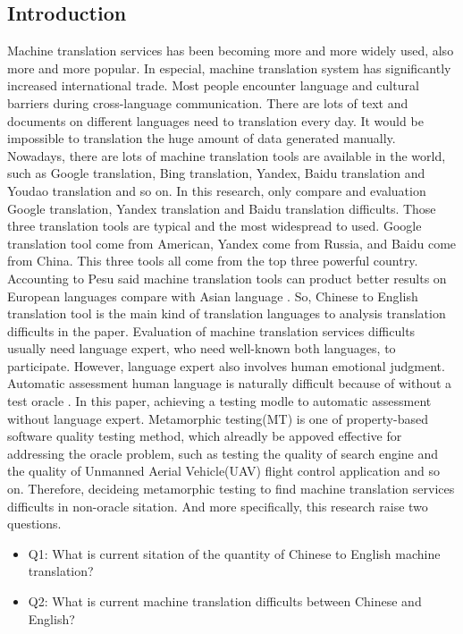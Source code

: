 \documentclass[conference]{IEEEtran}
\begin{document}
\begin{CJK*}{UTF8}{gbsn}
\section{Introduction}
Machine translation services has been becoming more and more widely used, also
more and more popular. In especial, machine translation system has significantly increased
international trade\cite{brynjolfsson2018does}.
Most people encounter language and cultural barriers
during cross-language communication. There are lots of text and documents on different languages need
to translation every day. It would be impossible to translation the huge amount
of data generated manually. Nowadays, there are lots of machine translation
tools are available in the world, such as Google translation, Bing translation,
Yandex, Baidu translation and Youdao translation and so on. In this research,
only compare and evaluation Google translation, Yandex translation and Baidu
translation difficults. Those three translation tools are typical and the most
widespread to used. Google translation tool come from American, Yandex come from
Russia, and Baidu come from China. This three tools all come from the top three
powerful country. Accounting to Pesu said machine translation
tools can product better results on European languages compare with Asian
language \cite{pesu2018monte}. So, Chinese to English translation tool is the main
kind of translation languages to analysis translation difficults in the paper.
Evaluation of machine translation services difficults usually need language
expert, who need well-known both languages, to participate. However, language
expert also involves human emotional judgment. Automatic assessment human
language is naturally difficult because of without a test oracle \cite{zhou2016metamorphic}.
In this paper, achieving a testing modle to automatic assessment
without language expert. Metamorphic testing(MT) is one of property-based
software quality testing method, which alreadly be appoved effective for
addressing the oracle problem, such as testing the quality of search engine
and the quality of Unmanned Aerial Vehicle(UAV) flight control application and so on.
Therefore, decideing metamorphic testing to find machine translation services
difficults in non-oracle sitation.
And more specifically, this research raise two questions.
\begin{itemize}
  \item Q1: What is current sitation of the quantity of Chinese to English
    machine translation?
  \item Q2: What is current machine translation difficults between Chinese and English?
\end{itemize}


\end{CJK*}
\end{document}
